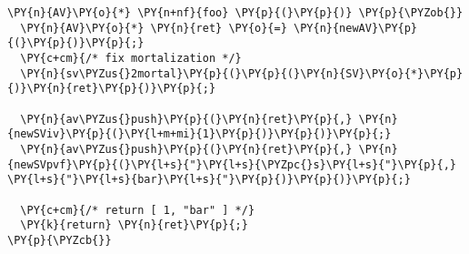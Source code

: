 \begin{Verbatim}[commandchars=\\\{\}]
\PY{n}{AV}\PY{o}{*} \PY{n+nf}{foo} \PY{p}{(}\PY{p}{)} \PY{p}{\PYZob{}}
  \PY{n}{AV}\PY{o}{*} \PY{n}{ret} \PY{o}{=} \PY{n}{newAV}\PY{p}{(}\PY{p}{)}\PY{p}{;}
  \PY{c+cm}{/* fix mortalization */}
  \PY{n}{sv\PYZus{}2mortal}\PY{p}{(}\PY{p}{(}\PY{n}{SV}\PY{o}{*}\PY{p}{)}\PY{n}{ret}\PY{p}{)}\PY{p}{;}

  \PY{n}{av\PYZus{}push}\PY{p}{(}\PY{n}{ret}\PY{p}{,} \PY{n}{newSViv}\PY{p}{(}\PY{l+m+mi}{1}\PY{p}{)}\PY{p}{)}\PY{p}{;}
  \PY{n}{av\PYZus{}push}\PY{p}{(}\PY{n}{ret}\PY{p}{,} \PY{n}{newSVpvf}\PY{p}{(}\PY{l+s}{"}\PY{l+s}{\PYZpc{}s}\PY{l+s}{"}\PY{p}{,} \PY{l+s}{"}\PY{l+s}{bar}\PY{l+s}{"}\PY{p}{)}\PY{p}{)}\PY{p}{;}

  \PY{c+cm}{/* return [ 1, "bar" ] */}
  \PY{k}{return} \PY{n}{ret}\PY{p}{;}
\PY{p}{\PYZcb{}}
\end{Verbatim}
